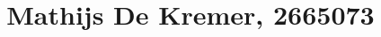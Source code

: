 \documentclass{article}
\begin{document}
\title{Mathijs De Kremer, 2665073}

\maketitle


\pagebreak

\pagebreak

\pagebreak


% 
% 
\end{document}

